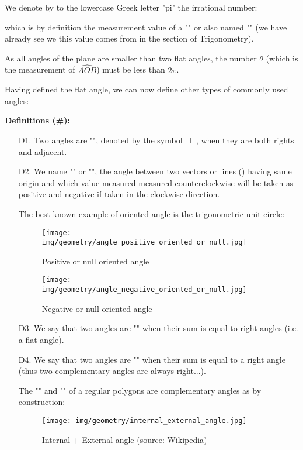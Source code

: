 	We denote by to the lowercase Greek letter "pi" the irrational number:
	
	which is by definition the measurement value of a "" or also named "" (we have already see we this value comes from in the section of Trigonometry).
	\begin{tcolorbox}[title=Remark,colframe=black,arc=10pt]
	As all angles of the plane are smaller than two flat angles, the number $\theta$ (which is the measurement of $\widehat{AOB}$) must be less than $2\pi$.
	\end{tcolorbox}
	Having defined the flat angle, we can now define other types of commonly used angles:
	
	\textbf{Definitions (\#\mydef):}
	\begin{enumerate}
		\item[D1.] Two angles are "", denoted by the symbol $\perp$, when they are both rights and adjacent.

		\item[D2.] We name "" or "", the angle between two vectors or lines () having same origin and which value measured measured counterclockwise will be taken as positive and negative if taken in the clockwise direction.
		
		The best known example of oriented angle is the trigonometric unit circle:
		\begin{figure}[H]
			\centering
			\texttt{[image: img/geometry/angle\_positive\_oriented\_or\_null.jpg]}
			\caption{Positive or null oriented angle}
		\end{figure}
		\begin{figure}[H]
			\centering
			\texttt{[image: img/geometry/angle\_negative\_oriented\_or\_null.jpg]}
			\caption{Negative or null oriented angle}
		\end{figure}
		
		\item[D3.] We say that two angles are "" when their sum is equal to right angles (i.e. a flat angle).

		\item[D4.] We say that two angles are "" when their sum is equal to a right angle (thus two complementary angles are always right...).
		
		The "" and "" of a regular polygons are complementary angles as by construction:
		\begin{figure}[H]
			\centering
			\texttt{[image: img/geometry/internal\_external\_angle.jpg]}
			\caption[Internal + External angle]{Internal + External angle (source: Wikipedia)}
		\end{figure}
		
	\end{enumerate}
